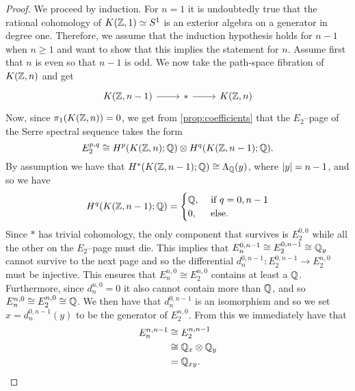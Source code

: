 \documentclass[../main.tex]{subfiles}
\begin{document}
\begin{proof}
We proceed by induction. For \( n=1 \) it is undoubtedly true that
the rational cohomology of \( K(\mathbb{Z},1)\simeq S^1 \) is an exterior algebra on a generator in
degree one. Therefore, we assume that the induction hypothesis holds
for \( n-1 \) when \( n\geq 1 \) and want to show that this implies
the statement for \( n \). Assume first that \( n \) is even so that
\( n-1 \) is odd. We now take the path-space fibration of \( K(\mathbb{Z}, n) \)
and get
\begin{equation}
    \begin{tikzcd}
        {K(\Z,n-1)} & {*} & {K(\Z, n)}
        \arrow[from=1-1, to=1-2]
        \arrow[from=1-2, to=1-3]
    \end{tikzcd}
\end{equation}
Now, since \( \pi_1(K(\mathbb{Z}, n))=0 \), we get from \cref{prop:coefficients} that the \( E_2 \)--page of
the Serre spectral sequence takes the form
\begin{equation}
    E^{p,q}_2 
    \cong H^p(K(\mathbb{Z}, n); \mathbb{Q}) \otimes H^q(K(\mathbb{Z}, n-1); \mathbb{Q}).
\end{equation}
By assumption we have that \( H^*(K(\mathbb{Z}, n-1); \mathbb{Q})\cong \Lambda_{\mathbb{Q}}(y) \),
where \( \lvert y\rvert=n-1 \), and so we have
\begin{equation}
    H^q(K(\mathbb{Z}, n-1); \mathbb{Q}) =
    \begin{cases}
        \mathbb{Q}, &\text{ if }q=0, n-1\\
        0, &\text{ else.}
    \end{cases}
\end{equation}
Since \( * \) has trivial cohomology, the only component that survives
is \( E_2^{0, 0} \) while all the other on the \( E_2 \)--page must
die. This implies that \( E_n^{0, n-1}\cong E_2^{0, n-1}\cong \mathbb{Q}_y \) cannot survive to
the next page and
so the differential \( d_n^{0, n-1}:E_2^{0, n-1}\rightarrow E_2^{n, 0} \)
must be injective. This ensures that \( E^{n, 0}_n\cong E^{n,0}_2 \) contains at
least a \( \mathbb{Q} \). Furthermore, since \( d_n^{n,0}=0 \) it also cannot
contain more than \( \mathbb{Q} \), and so \( E^{n,0}_n\cong E^{n,0}_2\cong\mathbb{Q} \).
We then have that \( d_n^{0, n-1} \) is an isomorphism and so we set
\( x=d_n^{0, n-1}(y) \) to be the generator of \( E^{n,0}_2 \). From
this we immediately have that 
\begin{align*}
    E^{n, n-1}_n &\cong E^{n,n-1}_2 \\
                 &\cong \mathbb{Q}_x\otimes \mathbb{Q}_y \\
                 &= \mathbb{Q}_{xy}.
\end{align*}

\end{proof}
\end{document}
